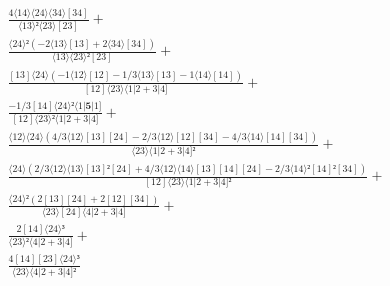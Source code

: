 \documentclass[varwidth, border=5pt]{standalone}
\begin{document}
\begin{my}
$\begin{gathered}
\scriptscriptstyle\frac{4⟨14⟩⟨24⟩⟨34⟩[34]}{⟨13⟩²⟨23⟩[23]} +\\
\scriptscriptstyle\frac{⟨24⟩²(-2⟨13⟩[13]+2⟨34⟩[34])}{⟨13⟩⟨23⟩²[23]} +\\
\scriptscriptstyle\frac{[13]⟨24⟩(-1⟨12⟩[12]-1/3⟨13⟩[13]-1⟨14⟩[14])}{[12]⟨23⟩⟨1|2+3|4]} +\\
\scriptscriptstyle\frac{-1/3[14]⟨24⟩²⟨1|𝟓|1]}{[12]⟨23⟩²⟨1|2+3|4]} +\\
\scriptscriptstyle\frac{⟨12⟩⟨24⟩(4/3⟨12⟩[13][24]-2/3⟨12⟩[12][34]-4/3⟨14⟩[14][34])}{⟨23⟩⟨1|2+3|4]²} +\\
\scriptscriptstyle\frac{⟨24⟩(2/3⟨12⟩⟨13⟩[13]²[24]+4/3⟨12⟩⟨14⟩[13][14][24]-2/3⟨14⟩²[14]²[34])}{[12]⟨23⟩⟨1|2+3|4]²} +\\
\scriptscriptstyle\frac{⟨24⟩²(2[13][24]+2[12][34])}{⟨23⟩[24]⟨4|2+3|4]} +\\
\scriptscriptstyle\frac{2[14]⟨24⟩³}{⟨23⟩²⟨4|2+3|4]} +\\
\scriptscriptstyle\frac{4[14][23]⟨24⟩³}{⟨23⟩⟨4|2+3|4]²} \phantom{+}
\end{gathered}$
\end{my}
\end{document}
